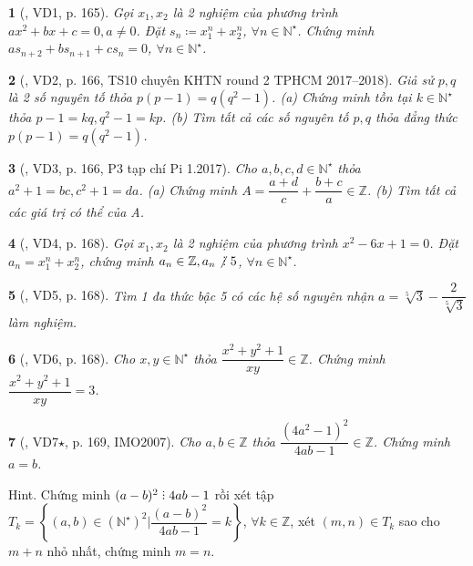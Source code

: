 \documentclass{article}
\newtheorem{baitoan}{}
\DeclareRobustCommand{\divby}{%
	\mathrel{\vbox{\baselineskip.65ex\lineskiplimit0pt\hbox{.}\hbox{.}\hbox{.}}}%
}
\begin{document}
\begin{baitoan}[\cite{Thu_Viet_Minh_ptb2}, VD1, p. 165]
	Gọi $x_1,x_2$ là 2 nghiệm của phương trình $ax^2 + bx + c = 0,a\ne0$. Đặt $s_n\coloneqq x_1^n + x_2^n$, $\forall n\in\mathbb{N}^\star$. Chứng minh $as_{n+2} + bs_{n+1} + cs_n = 0$, $\forall n\in\mathbb{N}^\star$.
\end{baitoan}

\begin{baitoan}[\cite{Thu_Viet_Minh_ptb2}, VD2, p. 166, TS10 chuyên KHTN round 2 TPHCM 2017--2018]
	Giả sử $p,q$ là 2 số nguyên tố thỏa $p(p - 1) = q(q^2 - 1)$. (a) Chứng minh tồn tại $k\in\mathbb{N}^\star$ thỏa $p - 1 = kq,q^2 - 1 = kp$. (b) Tìm tất cả các số nguyên tố $p,q$ thỏa đẳng thức $p(p - 1) = q(q^2 - 1)$.
\end{baitoan}

\begin{baitoan}[\cite{Thu_Viet_Minh_ptb2}, VD3, p. 166, P3 tạp chí Pi 1.2017]
	Cho $a,b,c,d\in\mathbb{N}^\star$ thỏa $a^2 + 1 = bc,c^2 + 1 = da$. (a) Chứng minh $A = \dfrac{a + d}{c} + 
	\dfrac{b + c}{a}\in\mathbb{Z}$. (b) Tìm tất cả các giá trị có thể của A.
\end{baitoan}

\begin{baitoan}[\cite{Thu_Viet_Minh_ptb2}, VD4, p. 168]
	Gọi $x_1,x_2$ là 2 nghiệm của phương trình $x^2 - 6x + 1 = 0$. Đặt $a_n = x_1^n + x_2^n$, chứng minh $a_n\in\mathbb{Z},a_n\not{\divby}\ 5$, $\forall n\in\mathbb{N}^\star$.
\end{baitoan}

\begin{baitoan}[\cite{Thu_Viet_Minh_ptb2}, VD5, p. 168]
	Tìm 1 đa thức bậc 5 có các hệ số nguyên nhận $a = \sqrt[5]{3} - \dfrac{2}{\sqrt[5]{3}}$ làm nghiệm.
\end{baitoan}

\begin{baitoan}[\cite{Thu_Viet_Minh_ptb2}, VD6, p. 168]
	Cho $x,y\in\mathbb{N}^\star$ thỏa $\dfrac{x^2 + y^2 + 1}{xy}\in\mathbb{Z}$. Chứng minh $\dfrac{x^2 + y^2 + 1}{xy} = 3$.
\end{baitoan}

\begin{baitoan}[\cite{Thu_Viet_Minh_ptb2}, VD7$\star$, p. 169, IMO2007]
	Cho $a,b\in\mathbb{Z}$ thỏa $\dfrac{(4a^2 - 1)^2}{4ab - 1}\in\mathbb{Z}$. Chứng minh $a = b$.
\end{baitoan}
{\sf Hint.} Chứng minh $(a - b)^2\divby4ab - 1$ rồi xét tập $T_k = \left\{(a,b)\in(\mathbb{N}^\star)^2|\dfrac{(a - b)^2}{4ab - 1} = k\right\}$, $\forall k\in\mathbb{Z}$, xét $(m,n)\in T_k$ sao cho $m + n$ nhỏ nhất, chứng minh $m = n$.
\end{document}
